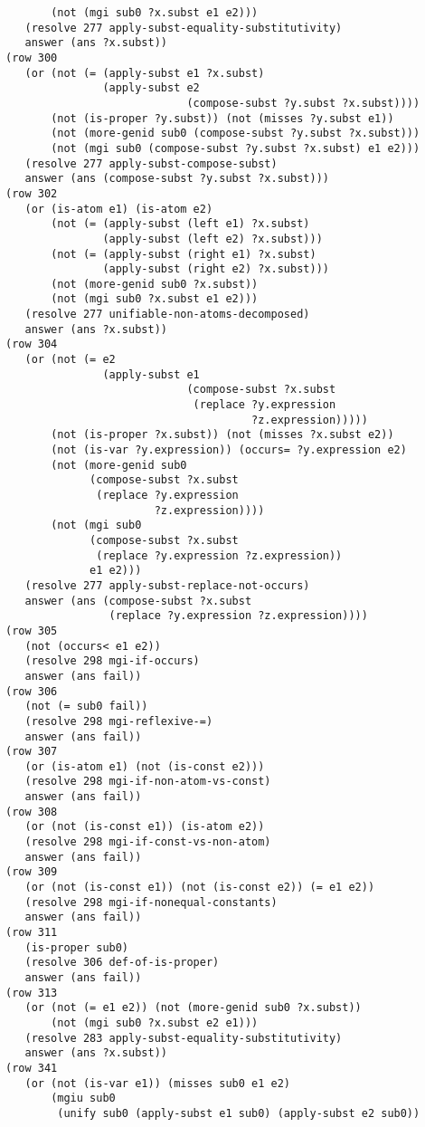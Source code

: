 \documentclass[runningheads]{llncs}
\begin{document}
\begin{verbatim}
       (not (mgi sub0 ?x.subst e1 e2)))
   (resolve 277 apply-subst-equality-substitutivity)
   answer (ans ?x.subst))
(row 300
   (or (not (= (apply-subst e1 ?x.subst)
               (apply-subst e2 
                            (compose-subst ?y.subst ?x.subst))))
       (not (is-proper ?y.subst)) (not (misses ?y.subst e1))
       (not (more-genid sub0 (compose-subst ?y.subst ?x.subst)))
       (not (mgi sub0 (compose-subst ?y.subst ?x.subst) e1 e2)))
   (resolve 277 apply-subst-compose-subst)
   answer (ans (compose-subst ?y.subst ?x.subst)))
(row 302
   (or (is-atom e1) (is-atom e2)
       (not (= (apply-subst (left e1) ?x.subst)
               (apply-subst (left e2) ?x.subst)))
       (not (= (apply-subst (right e1) ?x.subst)
               (apply-subst (right e2) ?x.subst)))
       (not (more-genid sub0 ?x.subst)) 
       (not (mgi sub0 ?x.subst e1 e2)))
   (resolve 277 unifiable-non-atoms-decomposed)
   answer (ans ?x.subst))
(row 304
   (or (not (= e2
               (apply-subst e1
                            (compose-subst ?x.subst
                             (replace ?y.expression 
                                      ?z.expression)))))
       (not (is-proper ?x.subst)) (not (misses ?x.subst e2))
       (not (is-var ?y.expression)) (occurs= ?y.expression e2)
       (not (more-genid sub0
             (compose-subst ?x.subst
              (replace ?y.expression 
                       ?z.expression))))
       (not (mgi sub0
             (compose-subst ?x.subst
              (replace ?y.expression ?z.expression))
             e1 e2)))
   (resolve 277 apply-subst-replace-not-occurs)
   answer (ans (compose-subst ?x.subst
                (replace ?y.expression ?z.expression))))
(row 305
   (not (occurs< e1 e2))
   (resolve 298 mgi-if-occurs)
   answer (ans fail))
(row 306
   (not (= sub0 fail))
   (resolve 298 mgi-reflexive-=)
   answer (ans fail))
(row 307
   (or (is-atom e1) (not (is-const e2)))
   (resolve 298 mgi-if-non-atom-vs-const)
   answer (ans fail))
(row 308
   (or (not (is-const e1)) (is-atom e2))
   (resolve 298 mgi-if-const-vs-non-atom)
   answer (ans fail))
(row 309
   (or (not (is-const e1)) (not (is-const e2)) (= e1 e2))
   (resolve 298 mgi-if-nonequal-constants)
   answer (ans fail))
(row 311
   (is-proper sub0)
   (resolve 306 def-of-is-proper)
   answer (ans fail))
(row 313
   (or (not (= e1 e2)) (not (more-genid sub0 ?x.subst))
       (not (mgi sub0 ?x.subst e2 e1)))
   (resolve 283 apply-subst-equality-substitutivity)
   answer (ans ?x.subst))
(row 341
   (or (not (is-var e1)) (misses sub0 e1 e2)
       (mgiu sub0
        (unify sub0 (apply-subst e1 sub0) (apply-subst e2 sub0)) 

\end{verbatim}
\end{document}

